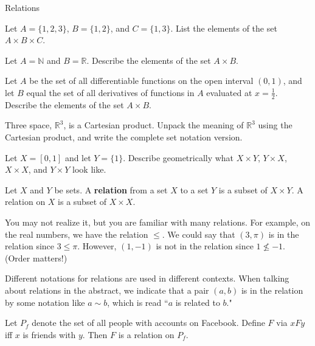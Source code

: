 \begin{section}{Relations}
\begin{exercise} 
Let $A=\{1, 2, 3\}$, $B=\{1,2\}$, and $C=\{1,3\}$. List the elements of the set $A \times B\times C$. 
\end{exercise}

\begin{exercise}
Let $A=\mathbb{N}$ and $B=\mathbb{R}$. Describe the elements of the set $A \times B$. 
\end{exercise}

\begin{exercise} Let $A$ be the set of all differentiable functions on the open interval $(0,1)$, and let $B$ equal the set of all derivatives of functions in $A$ evaluated at $x=\frac{1}{2}$. Describe the elements of the set $A \times B$. \end{exercise}

\begin{exercise}
Three space, $\mathbb{R}^{3}$, is a Cartesian product.  Unpack the meaning of $\mathbb{R}^{3}$ using the Cartesian product, and write the complete set notation version.
\end{exercise}

\begin{exercise}
Let $X=[0,1]$ and let $Y=\{1\}$.  Describe geometrically what $X\times Y$, $Y\times X$, $X\times X$, and $Y\times Y$ look like.
\end{exercise}

\begin{definition}
Let $X$ and $Y$ be sets. A \textbf{relation} from a set $X$ to a set $Y$ is a subset of $X \times Y$. A relation on $X$ is a subset of $X \times X$.  
\end{definition}

\begin{example}
You may not realize it, but you are familiar with many relations.  For example, on the real numbers, we have the relation $\leq$.  We could say that $(3,\pi)$ is in the relation since $3\leq \pi$.  However, $(1,-1)$ is not in the relation since $1\nleq -1$.  (Order matters!)
\end{example}

\begin{remark}
Different notations for relations are used in different contexts.  When talking about relations in the abstract, we indicate that a pair $(a,b)$ is in the relation by some notation like $a\sim b$, which is read ``$a$ is related to $b$."
\end{remark}

\begin{example}
Let $P_f$ denote the set of all people with accounts on Facebook.  Define  $F$ via $xFy$ iff $x$ is friends with $y$.  Then $F$ is a relation on $P_f$.
\end{example}


\end{section}
